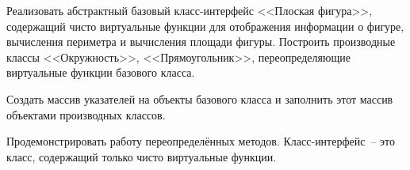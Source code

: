 Реализовать абстрактный базовый класс-интерфейс <<Плоская
фигура>>, содержащий чисто виртуальные функции для
отображения информации о фигуре, вычисления периметра и
вычисления площади фигуры. Построить производные
классы <<Окружность>>, <<Прямоугольник>>, переопределяющие
виртуальные функции базового класса.

Создать массив
указателей на объекты базового класса и заполнить этот
массив объектами производных классов.

Продемонстрировать работу переопределённых методов.
Класс-интерфейс~-- это класс, содержащий только чисто
виртуальные функции.
